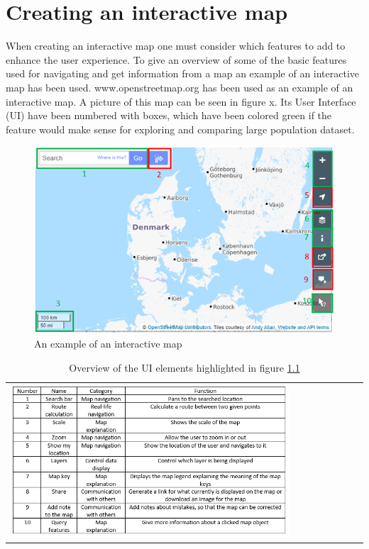 \chapter{Creating an interactive map}
When creating an interactive map one must consider which features to add to enhance the user experience. To give an overview of some of the basic features used for navigating and get information from a map an example of an interactive map has been used. www.openstreetmap.org has been used as an example of an interactive map. A picture of this map can be seen in figure x. Its User Interface (UI) have been numbered with boxes, which have been colored green if the feature would make sense for exploring and comparing large population dataset.  
\citep{OpenStreetMap}

\begin{figure} [H]
	\centering
	\includegraphics[width=.8\textwidth]{Pictures/InteractiveMap}
	\caption{An example of an interactive map}
	\label{InteractiveMap}
\end{figure}

\begin{table}[htbp]
	\centering
	\begin{tabular}{l}
		\includegraphics[width=0.8\textwidth]{Pictures/tabOSMFunctions}
	\end{tabular}
	\caption{Overview of the UI elements highlighted in figure \ref{InteractiveMap}}
	\label{tabOSMFunctions}
\end{table}

